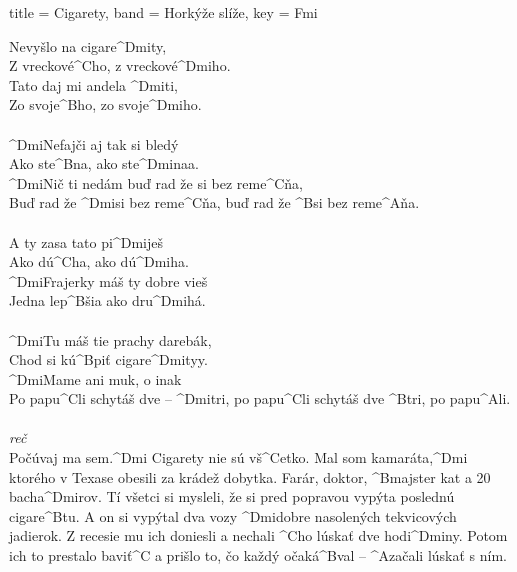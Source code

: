 \begin{song}[
    remember-chords = true ,
    verse/numbered = true ,
    transpose-capo = true
  ]{
    title = Cigarety,
    band = Horkýže slíže,
    key  = Fmi
  }

	\begin{verse*}
	Nevyšlo na cigare^{Dmi}ty, \\
	Z vreckové^{C}ho, z vreckové^{Dmi}ho. \\
	Tato daj mi andela ^{Dmi}ti, \\
	Zo svoje^{B}ho, zo svoje^{Dmi}ho. \\
	\\
	^{Dmi}Nefajči aj tak si bledý \\
	Ako ste^{B}na, ako ste^{Dmi}naa. \\
	^{Dmi}Nič ti nedám buď rad že si bez reme^{C}ňa, \\
	Buď rad že ^{Dmi}si bez reme^{C}ňa, buď rad že ^{B}si bez reme^{A}ňa. \\
	\\
	A ty zasa tato pi^{Dmi}ješ \\
	Ako dú^{C}ha, ako dú^{Dmi}ha. \\
	^{Dmi}Frajerky máš ty dobre vieš \\
	Jedna lep^{B}šia ako dru^{Dmi}há. \\
 	\\
	^{Dmi}Tu máš tie prachy darebák, \\
	Chod si kú^{B}piť cigare^{Dmi}tyy. \\
	^{Dmi}Mame ani muk, o inak \\
	Po papu^{C}li schytáš dve – ^{Dmi}tri, po papu^{C}li schytáš dve ^{B}tri, po papu^{A}li. \\
 	\\
	\textit{reč} \\
	Počúvaj ma sem.^{Dmi} Cigarety nie sú vš^{C}etko. Mal som kamaráta,^{Dmi} ktorého v Texase obesili za krádež dobytka. Farár, doktor, ^{B}majster kat a 20 bacha^{Dmi}rov. Tí všetci si mysleli, že si pred popravou vypýta poslednú cigare^{B}tu. A on si vypýtal dva vozy ^{Dmi}dobre nasolených tekvicových jadierok. Z recesie mu ich doniesli a nechali ^{C}ho lúskať dve hodi^{Dmi}ny. Potom ich to prestalo baviť^{C} a prišlo to, čo každý očaká^{B}val – ^{A}začali lúskať s ním.
	\end{verse*}

\end{song}